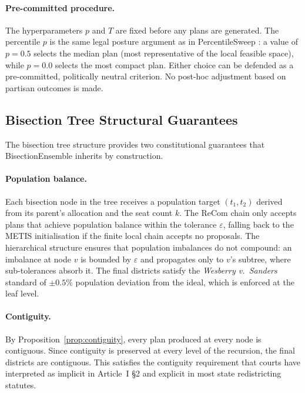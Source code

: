 \paragraph{Pre-committed procedure.}
The hyperparameters $p$ and $T$ are fixed before any plans are generated.
The percentile $p$ is the same legal posture argument as in PercentileSweep
\citep{dellaLibera2026percentilesweep}: a value of $p = 0.5$ selects the
median plan (most representative of the local feasible space), while $p = 0.0$
selects the most compact plan. Either choice can be defended as a pre-committed,
politically neutral criterion. No post-hoc adjustment based on partisan outcomes
is made.

\subsection{Bisection Tree Structural Guarantees}
\label{sec:legal:structure}

The bisection tree structure provides two constitutional guarantees that
BisectionEnsemble inherits by construction.

\paragraph{Population balance.}
Each bisection node in the tree receives a population target $(t_1, t_2)$
derived from its parent's allocation and the seat count $k$. The ReCom chain
only accepts plans that achieve population balance within the tolerance
$\varepsilon$, falling back to the METIS initialisation if the finite local
chain accepts no proposals.
The hierarchical structure ensures that population imbalances do not compound:
an imbalance at node $v$ is bounded by $\varepsilon$ and propagates only to
$v$'s subtree, where sub-tolerances absorb it. The final districts satisfy
the \emph{Wesberry v.\ Sanders} standard \citep{wesberry1964} of $\pm 0.5\%$
population deviation from the ideal, which is enforced at the leaf level.

\paragraph{Contiguity.}
By Proposition~\ref{prop:contiguity}, every plan produced at every node is
contiguous. Since contiguity is preserved at every level of the recursion,
the final districts are contiguous. This satisfies the contiguity requirement
that courts have interpreted as implicit in Article~I \S2 and explicit in
most state redistricting statutes.

